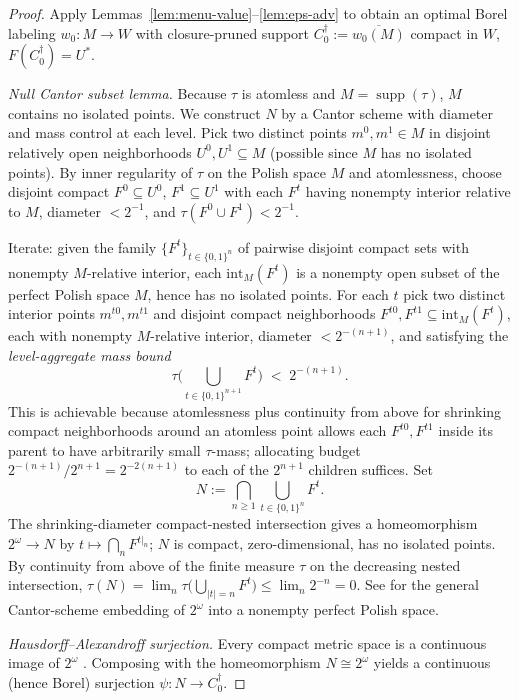 \documentclass[11pt]{article}
\theoremstyle{definition}
\theoremstyle{remark}
\newcommand{\suppset}{\operatorname{supp}}
\begin{document}
\begin{proof}
Apply Lemmas~\ref{lem:menu-value}--\ref{lem:eps-adv} to obtain an
optimal Borel labeling $w_0 : M \to W$ with closure-pruned support
$C^\dagger_0 := \overline{w_0(M)}$ compact in $W$, $F(C^\dagger_0) = U^*$.

\emph{Null Cantor subset lemma.} Because $\tau$ is atomless and
$M = \suppset(\tau)$, $M$ contains no isolated points. We construct $N$
by a Cantor scheme with diameter and mass control at each level. Pick
two distinct points $m^0, m^1 \in M$ in disjoint relatively open
neighborhoods $U^0, U^1 \subseteq M$ (possible since $M$ has no
isolated points). By inner regularity of $\tau$ on the Polish space
$M$ \cite[Thm.~7.1.7, Vol.~II]{Bogachev2007} and atomlessness, choose
disjoint compact $F^0 \subseteq U^0$, $F^1 \subseteq U^1$ with each
$F^t$ having nonempty interior relative to $M$, diameter $<2^{-1}$,
and $\tau(F^0 \cup F^1) < 2^{-1}$.

Iterate: given the family $\{F^t\}_{t \in \{0,1\}^n}$ of pairwise
disjoint compact sets with nonempty $M$-relative interior, each
$\mathrm{int}_M(F^t)$ is a nonempty open subset of the perfect Polish
space $M$, hence has no isolated points. For each $t$ pick two
distinct interior points $m^{t0}, m^{t1}$ and disjoint compact
neighborhoods $F^{t0}, F^{t1} \subseteq \mathrm{int}_M(F^t)$, each
with nonempty $M$-relative interior, diameter $<2^{-(n+1)}$, and
satisfying the \emph{level-aggregate mass bound}
\[
  \tau\!\!\Big( \bigcup_{t \in \{0,1\}^{n+1}} F^t \Big) \;<\; 2^{-(n+1)}.
\]
This is achievable because atomlessness plus continuity from above
for shrinking compact neighborhoods around an atomless point allows
each $F^{t0}, F^{t1}$ inside its parent to have arbitrarily small
$\tau$-mass; allocating budget $2^{-(n+1)}/2^{n+1} = 2^{-2(n+1)}$ to
each of the $2^{n+1}$ children suffices. Set
\[
  N := \bigcap_{n \ge 1} \bigcup_{t \in \{0,1\}^n} F^t.
\]
The shrinking-diameter compact-nested intersection gives a homeomorphism
$2^\omega \to N$ by $t \mapsto \bigcap_n F^{t|_n}$; $N$ is compact,
zero-dimensional, has no isolated points. By continuity from above
of the finite measure $\tau$ on the decreasing nested intersection,
$\tau(N) = \lim_n \tau\!\big(\bigcup_{|t|=n} F^t\big) \le \lim_n 2^{-n}
= 0$. See \cite[Thm.~6.2]{Kechris1995} for the general Cantor-scheme
embedding of $2^\omega$ into a nonempty perfect Polish space.

\emph{Hausdorff--Alexandroff surjection.} Every compact metric space
is a continuous image of $2^\omega$
\cite[Thm.~4.18]{Kechris1995}. Composing with the homeomorphism
$N \cong 2^\omega$ yields a continuous (hence Borel) surjection
$\psi : N \to C^\dagger_0$.


\end{proof}
\end{document}
